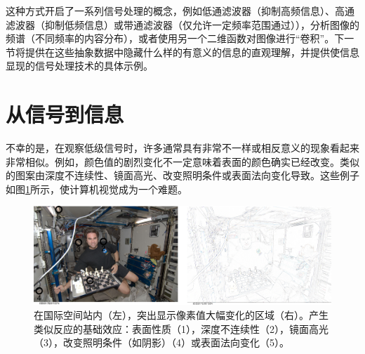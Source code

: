 这种方式开启了一系列信号处理的概念，例如低通滤波器（抑制高频信息）、高通滤波器（抑制低频信息）或带通滤波器（仅允许一定频率范围通过）），分析图像的频谱（不同频率的内容分布），或者使用另一个二维函数对图像进行“卷积”。下一节将提供在这些抽象数据中隐藏什么样的有意义的信息的直观理解，并提供使信息显现的信号处理技术的具体示例。


\section{从信号到信息}
不幸的是，在观察低级信号时，许多通常具有非常不一样或相反意义的现象看起来非常相似。例如，颜色值的剧烈变化不一定意味着表面的颜色确实已经改变。类似的图案由深度不连续性、镜面高光、改变照明条件或表面法向变化导致。这些例子如图\ref{fig:iss_edges}所示，使计算机视觉成为一个难题。


\begin{figure}[!htb]
	\centering
		\includegraphics[width=\textwidth]{figs/iss_edges}
	\caption{在国际空间站内（左），突出显示像素值大幅变化的区域（右）。产生类似反应的基础效应：表面性质（1），深度不连续性（2），镜面高光（3），改变照明条件（如阴影）（4）或表面法向变化（5）。
	\label{fig:iss_edges}}
\end{figure}

